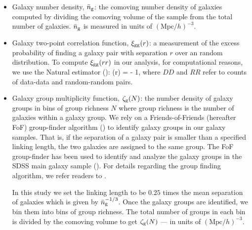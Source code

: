 \begin{itemize}
\item Galaxy number density, $\bar{n}_{\mathrm{g}}$: the comoving number density of galaxies computed  
by dividing the comoving volume of the sample from the total number of galaxies. $\bar{n}_{\mathrm{g}}$ is 
measured in units of $(\mathrm{Mpc}/h)^{-3}$.  

\item Galaxy two-point correlation function, $\xi_{\mathrm{gg}}(r)$: a measurement of the excess probability 
of finding a galaxy pair with separation $r$ over an random distribution. To compute $\xi_{\mathrm{gg}}(rr)$
in our analysis, for computational reasons, we use the Natural estimator (\citealt{peebles80}): 
\beq
\xi(r) =  - 1, 
\eeq
where $DD$ and $RR$ refer to counts of data-data and random-random pairs.  

\item Galaxy group multiplicity function, $\mathcal{\zeta}_{\rm g}(N)$: the number density of galaxy groups in bins 
of group richness $N$ where group richness is the number of galaxies within a galaxy group. We 
rely on a Friends-of-Friends (hereafter FoF) group-finder algorithm (\citealt{fof}) to identify 
galaxy groups in our galaxy samples. That is, if the separation of a galaxy pair is smaller than a 
specified linking length, the two galaxies are assigned to the same group. The FoF group-finder 
has been used to identify and analyze the galaxy groups in the SDSS main galaxy sample (\cite{groups}). 
For details regarding the group finding algorithm, we refer readers to \cite{fof}. 

In this study we set the linking length to be $0.25$ times the mean separation of galaxies which 
is given by $\bar{n}_{\mathrm{g}}^{-1/3}$. Once the galaxy groups are identified, we bin them into bins of 
group richness. The total number of groups in each bin is divided by the comoving volume to get 
$\mathcal{\zeta}_{\rm g}(N)$ --- in units of $(\mathrm{Mpc}/h)^{-3}$. 
\end{itemize}

